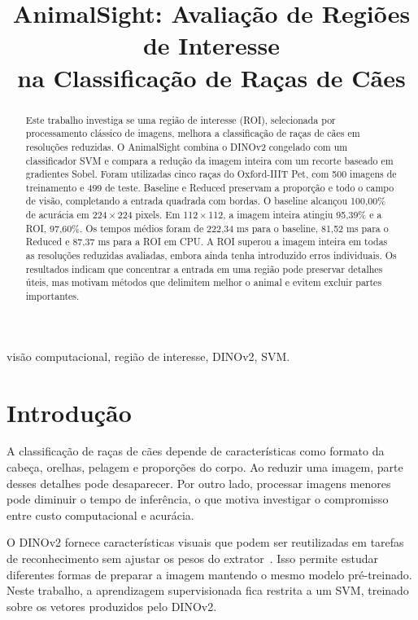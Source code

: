 \documentclass[conference]{IEEEtran}
\title{AnimalSight: Avaliação de Regiões de Interesse\\
na Classificação de Raças de Cães}
\author{
\IEEEauthorblockN{João Meyer Muhlmann}
\IEEEauthorblockA{Universidade Federal do Paraná\\
Trabalho Final de Visão Computacional\\
Novembro de 2026}
}
\begin{document}
\maketitle

\begin{abstract}
Este trabalho investiga se uma região de interesse (ROI), selecionada
por processamento clássico de imagens, melhora a classificação de
raças de cães em resoluções reduzidas. O AnimalSight combina o DINOv2
congelado com um classificador SVM e compara a redução da imagem inteira
com um recorte baseado em gradientes Sobel. Foram utilizadas cinco raças
do Oxford-IIIT Pet, com 500 imagens de treinamento e 499 de teste.
Baseline e Reduced preservam a proporção e todo o campo de visão,
completando a entrada quadrada com bordas. O baseline alcançou 100,00\%
de acurácia em 224\,$\times$\,224 pixels. Em 112\,$\times$\,112,
a imagem inteira atingiu 95,39\% e a ROI, 97,60\%.
Os tempos médios foram de 222,34 ms para o baseline, 81,52 ms
para o Reduced e 87,37 ms para a ROI em CPU.
A ROI superou a imagem inteira em todas as resoluções reduzidas
avaliadas, embora ainda tenha introduzido erros individuais.
Os resultados indicam que concentrar a entrada em uma região pode
preservar detalhes úteis, mas motivam métodos que delimitem melhor
o animal e evitem excluir partes importantes.
\end{abstract}

\begin{IEEEkeywords}
visão computacional, região de interesse, DINOv2, SVM.
\end{IEEEkeywords}

\section{Introdução}
A classificação de raças de cães depende de características como
formato da cabeça, orelhas, pelagem e proporções do corpo. Ao reduzir
uma imagem, parte desses detalhes pode desaparecer. Por outro lado,
processar imagens menores pode diminuir o tempo de inferência, o que
motiva investigar o compromisso entre custo computacional e acurácia.

O DINOv2 fornece características visuais que podem ser reutilizadas
em tarefas de reconhecimento sem ajustar os pesos do extrator~\cite{dinov2}.
Isso permite estudar diferentes formas de preparar a imagem mantendo
o mesmo modelo pré-treinado. Neste trabalho, a aprendizagem supervisionada
fica restrita a um SVM, treinado sobre os vetores produzidos pelo DINOv2.
\end{document}
